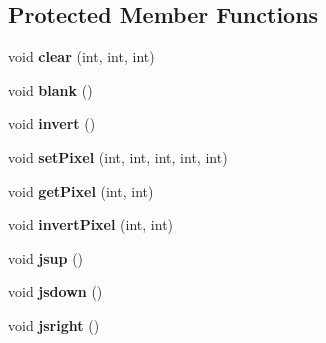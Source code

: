 \subsection*{Protected Member Functions}
\begin{DoxyCompactItemize}
\item 
void {\bfseries clear} (int, int, int)\hypertarget{class_roomba_sense_h_a_t_a88a17837a2404ac4f27a924a0ae7fe54}{}\label{class_roomba_sense_h_a_t_a88a17837a2404ac4f27a924a0ae7fe54}

\item 
void {\bfseries blank} ()\hypertarget{class_roomba_sense_h_a_t_aeffae699ba80f658b1ee9eaae1eec02f}{}\label{class_roomba_sense_h_a_t_aeffae699ba80f658b1ee9eaae1eec02f}

\item 
void {\bfseries invert} ()\hypertarget{class_roomba_sense_h_a_t_a3b6bf910dc5094fb7d33c46391f254d3}{}\label{class_roomba_sense_h_a_t_a3b6bf910dc5094fb7d33c46391f254d3}

\item 
void {\bfseries set\+Pixel} (int, int, int, int, int)\hypertarget{class_roomba_sense_h_a_t_ab4505f815eec5eb5cbf07328252452cf}{}\label{class_roomba_sense_h_a_t_ab4505f815eec5eb5cbf07328252452cf}

\item 
void {\bfseries get\+Pixel} (int, int)\hypertarget{class_roomba_sense_h_a_t_a98a46d008d2fcc4213e838e77e75b4ed}{}\label{class_roomba_sense_h_a_t_a98a46d008d2fcc4213e838e77e75b4ed}

\item 
void {\bfseries invert\+Pixel} (int, int)\hypertarget{class_roomba_sense_h_a_t_a967e46be000a155dfc3500591fd99b30}{}\label{class_roomba_sense_h_a_t_a967e46be000a155dfc3500591fd99b30}

\item 
void {\bfseries jsup} ()\hypertarget{class_roomba_sense_h_a_t_a48f5aa05abb5d09e6fcf5b557d6f5e85}{}\label{class_roomba_sense_h_a_t_a48f5aa05abb5d09e6fcf5b557d6f5e85}

\item 
void {\bfseries jsdown} ()\hypertarget{class_roomba_sense_h_a_t_a7f13756bd78266bd9472b82162c2d0a0}{}\label{class_roomba_sense_h_a_t_a7f13756bd78266bd9472b82162c2d0a0}

\item 
void {\bfseries jsright} ()\hypertarget{class_roomba_sense_h_a_t_addf0970f6be2476ef2a8f99ad076a126}{}\label{class_roomba_sense_h_a_t_addf0970f6be2476ef2a8f99ad076a126}


\end{DoxyCompactItemize}
